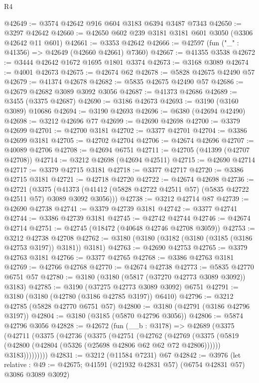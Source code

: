 \begin{lexlean}{R4}
\begin{coremodule}
@42649 := @3574 @42642 @916 @604 @3183 @6394 @3487 @7343
@42650 := @3297 @42642
@42660 := @42650 @602 @239 @3181 @3181 @601 @3050 (@3306 @42642 @11 @601)
@42661 := @3353 @42642
@42666 := @42597 (fun ("_" : @41356) => @42649 (@42660 @42661) @7360)
@42667 := @41355 @3538
@42672 := @3444 @42642 @1672 @1695 @1801 @3374
@42673 := @3168 @3089
@42674 := @4001 @42673
@42675 := @42674 @62
@42678 := @5828 @42675 @42490 @57
@42679 := @41374 @42678
@42682 := @5835 @42675 @42490 @57
@42686 := @42679 @42682 @3089 @3092 @3056
@42687 := @41373 @42686
@42689 := @3455 (@3375 @42687)
@42690 := @3186 @42673
@42693 := @3190 (@3160 @3089) @10686
@42694 := @3190 @42693
@42696 := @6380 (@42694 @42490)
@42698 := @3212 @42696 @77
@42699 := @42690 @42698
@42700 := @3379 @42699
@42701 := @42700 @3181
@42702 := @3377 @42701
@42704 := @3386 @42699 @3181
@42705 := @42702 @42704
@42706 := @42674 @42696
@42707 := @40089 @42706
@42708 := @42694 @6751
@42711 := @42705 (@41399 (@42707 @42708))
@42714 := @3212 @42698 (@42694 @42511)
@42715 := @42690 @42714
@42717 := @3379 @42715 @3181
@42718 := @3377 @42717
@42720 := @3386 @42715 @3181
@42721 := @42718 @42720
@42722 := @42674 @42698
@42736 := @42721
    (@3375 (@41373 (@41412 (@5828 @42722 @42511 @57) (@5835 @42722 @42511 @57) @3089 @3092 @3056)))
@42738 := @3212 @42714 @87
@42739 := @42690 @42738
@42741 := @3379 @42739 @3181
@42742 := @3377 @42741
@42744 := @3386 @42739 @3181
@42745 := @42742 @42744
@42746 := @42674 @42714
@42751 := @42745 (@18472 (@40648 @42746 @42708 @3059))
@42753 := @3212 @42738 @42708
@42762 := @3180 (@3180 (@3182 (@3180 (@3185 (@3186 @42753 @3197)) @3181)) @3181)
@42763 := @42690 @42753
@42765 := @3379 @42763 @3181
@42766 := @3377 @42765
@42768 := @3386 @42763 @3181
@42769 := @42766 @42768
@42770 := @42674 @42738
@42773 := @5835 @42770 @6751 @57
@42780 := @3180 (@3180 (@5817 (@37270 @42773 @3089 @3092)) @3183)
@42785 := @3190 (@37275 @42773 @3089 @3092) @6751
@42791 := @3180 (@3180 (@42780 (@3186 @42785 @3197)) @6410)
@42796 := @3212 @42785 (@5828 @42770 @6751 @57)
@42800 := @3180 (@42791 (@3186 @42796 @3197))
@42804 := @3180 (@3185 (@5870 @42796 @3056))
@42806 := @5874 @42796 @3056
@42828 := @42672
    (fun (__b : @3178) =>
    @42689
      (@3375
        (@42711
          (@3375
            (@42736
              (@3375
                (@42751
                  (@42762
                    (@42769
                      (@3375 (@5819 (@42800 (@42804 (@5326 (@25698 @42806 @62 @62 @72 @42806))))))
                      @3183)))))))))
@42831 := @3212 (@11584 @7231) @67
@42842 := @3976
    (let relative : @49 := @42675; @41591 (@21932 @42831 @57) (@6754 @42831 @57) @3086 @3089 @3092)

\end{coremodule}
\end{lexlean}
